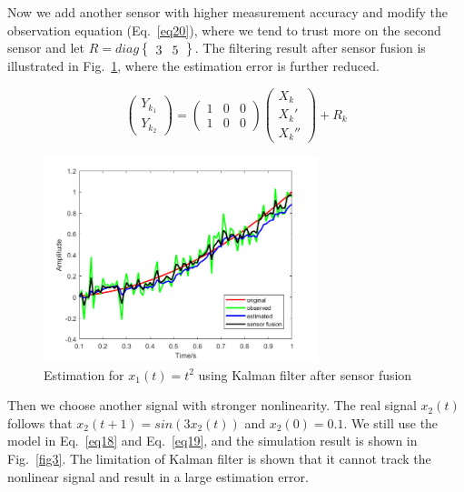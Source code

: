 \documentclass[conference]{IEEEtran}
\begin{document}
	Now we add another sensor with higher measurement accuracy and modify the observation equation (Eq.~\ref{eq20}), where we tend to trust more on the second sensor and let $R=diag\begin{Bmatrix}
	3 &5
	\end{Bmatrix}$. The filtering result after sensor fusion is illustrated in Fig.~\ref{fig2}, where the estimation error is further reduced.
	
	\begin{equation}
	\begin{pmatrix}
	Y_{k_{1}}\\ 
	Y_{k_{2}}
	\end{pmatrix}=\begin{pmatrix}
	1 &0  &0 \\ 
	1 &0  & 0
	\end{pmatrix}\begin{pmatrix}
	X_{k}\\ 
	{X_{k}}'\\ 
	{X_{k}}''
	\end{pmatrix}+R_{k}
	\label{eq20}
	\end{equation}
	
	
	\begin{figure}[h]
		\centering
		\includegraphics[width=8cm]{fig2.png}
		\caption{Estimation for $x_{1}(t)=t^{2}$ using Kalman filter after sensor fusion}
		\label{fig2}
	\end{figure}

	Then we choose another signal with stronger nonlinearity. The real signal $x_{2}(t)$ follows that  $x_{2}(t+1)=sin(3x_{2}(t))$ and $x_{2}(0)=0.1$. We still use the model in Eq.~\ref{eq18} and Eq.~\ref{eq19}, and the simulation result is shown in Fig.~\ref{fig3}. The limitation of Kalman filter is shown that it cannot track the nonlinear signal and result in a large estimation error.
	
\end{document}
